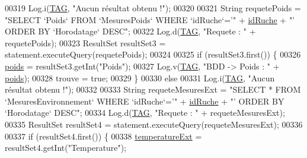 \begin{DoxyCode}
00319                             Log.i(\hyperlink{classfr_1_1campus_1_1laurainc_1_1honeybee_1_1_ruche_a44739cbb0fa7451c1edc240a3f51c257}{TAG}, \textcolor{stringliteral}{"Aucun résultat obtenu !"});
00320 
00321                         String requetePoids = \textcolor{stringliteral}{"SELECT `Poids` FROM `MesuresPoids` WHERE `idRuche`='"} + 
      \hyperlink{classfr_1_1campus_1_1laurainc_1_1honeybee_1_1_ruche_aee4d51dd1634b799427d89e168cdadf4}{idRuche} + \textcolor{stringliteral}{"' ORDER BY `Horodatage` DESC"};
00322                         Log.d(\hyperlink{classfr_1_1campus_1_1laurainc_1_1honeybee_1_1_ruche_a44739cbb0fa7451c1edc240a3f51c257}{TAG}, \textcolor{stringliteral}{"Requete : "} + requetePoids);
00323                         ResultSet resultSet3 = statement.executeQuery(requetePoids);
00324 
00325                         \textcolor{keywordflow}{if} (resultSet3.first()) \{
00326                             \hyperlink{classfr_1_1campus_1_1laurainc_1_1honeybee_1_1_ruche_a9e4ace1f74bc297cb50e99643203367b}{poids} = resultSet3.getInt(\textcolor{stringliteral}{"Poids"});
00327                             Log.v(\hyperlink{classfr_1_1campus_1_1laurainc_1_1honeybee_1_1_ruche_a44739cbb0fa7451c1edc240a3f51c257}{TAG}, \textcolor{stringliteral}{"BDD -> Poids : "} + \hyperlink{classfr_1_1campus_1_1laurainc_1_1honeybee_1_1_ruche_a9e4ace1f74bc297cb50e99643203367b}{poids});
00328                             trouve = \textcolor{keyword}{true};
00329                         \}
00330                         \textcolor{keywordflow}{else}
00331                             Log.i(\hyperlink{classfr_1_1campus_1_1laurainc_1_1honeybee_1_1_ruche_a44739cbb0fa7451c1edc240a3f51c257}{TAG}, \textcolor{stringliteral}{"Aucun résultat obtenu !"});
00332 
00333                         String requeteMesuresExt = \textcolor{stringliteral}{"SELECT * FROM `MesuresEnvironnement` WHERE `idRuche`='"}
       + \hyperlink{classfr_1_1campus_1_1laurainc_1_1honeybee_1_1_ruche_aee4d51dd1634b799427d89e168cdadf4}{idRuche} + \textcolor{stringliteral}{"' ORDER BY `Horodatage` DESC"};
00334                         Log.d(\hyperlink{classfr_1_1campus_1_1laurainc_1_1honeybee_1_1_ruche_a44739cbb0fa7451c1edc240a3f51c257}{TAG}, \textcolor{stringliteral}{"Requete : "} + requeteMesuresExt);
00335                         ResultSet resultSet4 = statement.executeQuery(requeteMesuresExt);
00336 
00337                         \textcolor{keywordflow}{if} (resultSet4.first()) \{
00338                             \hyperlink{classfr_1_1campus_1_1laurainc_1_1honeybee_1_1_ruche_aabdc13a8650aed77ee5497236e79174b}{temperatureExt} = resultSet4.getInt(\textcolor{stringliteral}{"Temperature"});

\end{DoxyCode}
